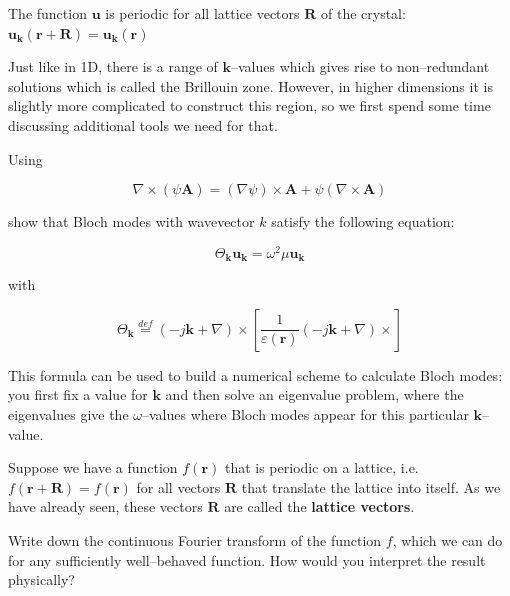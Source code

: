 The function ${\mathbf u}$ is periodic for all lattice vectors ${\mathbf R}$ of the crystal: ${\mathbf u}_{\mathbf k} ({\mathbf r} + {\mathbf R})  = {\mathbf u}_{\mathbf k} ({\mathbf r})$

Just like in 1D, there is a range of ${\mathbf k}$--values which gives rise to non--redundant solutions which is called the Brillouin zone. However, in higher dimensions it is slightly more complicated to construct this region, so we first spend some time discussing additional tools we need for that.

\pagebreak

\begin{exer}

Using

$$ \nabla \times (\psi {\mathbf A}) = (\nabla \psi) \times {\mathbf A} + \psi (\nabla \times {\mathbf A}) $$
  
show that Bloch modes with wavevector $k$ satisfy the following equation:

$$\Theta_{\mathbf k} {\mathbf u}_{\mathbf k} = \omega^2 \mu {\mathbf u}_{\mathbf k}$$

with

$$\Theta_{\mathbf k} \stackrel{def}{=} (-j {\mathbf k} + \nabla) \times \left [ \frac{1}{\varepsilon({\mathbf r})}(-j{\mathbf k} +\nabla) \times \right ]$$

This formula can be used to build a numerical scheme to calculate Bloch modes: you first fix a value for ${\mathbf k}$ and then solve an eigenvalue problem, where the eigenvalues give the $\omega$--values where Bloch modes appear for this particular ${\mathbf k}$--value.

\end{exer}



\pagebreak


Suppose we have a function $f({\mathbf r})$ that is periodic on a lattice, i.e. $f({\mathbf r} + {\mathbf R}) = f({\mathbf r})$ for all vectors ${\mathbf R}$ that translate the lattice into itself. As we have already seen, these vectors ${\mathbf R}$ are called the \textbf{lattice vectors}.

\begin{cue}
  Write down the continuous Fourier transform of the function $f$, which we can do for any sufficiently well--behaved function. How would you interpret the result physically?
\end{cue}

